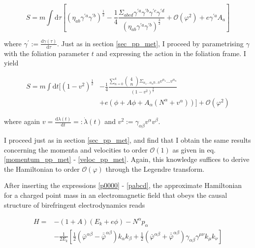 \documentclass[11pt]{article}
\begin{document}
\begin{equation}
	S = 
	m \int \mathrm{d} \tau 
	\left[
		\left( 
			\eta_{a b} \gamma^{\prime a} \gamma^{\prime b} 
		\right)^{\frac{1}{2}}
	 -
	 \frac{1}{4}
	 \frac{
	 \Sigma_{a b c d}
	 \gamma^{\prime a} \gamma^{\prime b} \gamma^{\prime c} \gamma^{\prime d}
	 }{\left( 
			\eta_{a b} \gamma^{\prime a} \gamma^{\prime b} 
		\right)^{\frac{3}{2}}}
		+
		\mathcal{O} \left( \varphi^2 \right)
		+ e \gamma^{\prime a} A_a
	\right]
\end{equation}

where $\gamma^\prime := \frac{\mathrm{d} \gamma \left( \tau \right)}{\mathrm{d} \tau}$. Just as in section \ref{sec_pp_met}, I proceed by parametrising $\gamma$ with the foliation parameter $t$ and  expressing the action in the foliation frame. I yield

\begin{equation}
\begin{split}
	S = 
	m \int \mathrm{d} t 
	[
		\left( 
			1 - v^2
		\right)^{\frac{1}{2}}
	&-
	\frac{1}{4}
	\frac{
	\sum_{n = 0}^4 
	\begin{pmatrix}
		4\\ n
	\end{pmatrix}
	 \Sigma_{\alpha_1 \dots \alpha_n 0 \dots 0}
	 v^{\alpha_1} \dots v^{\alpha_n}
	 }{\left( 
			1 - v^2
		\right)^{\frac{3}{2}}} \\
		&+ e \left(
			\phi + A \phi +  A_\alpha \left( N^\alpha + v^\alpha\right)
		\right) 
	]
	+
	\mathcal{O} \left( \varphi^2 \right)
\end{split}
\end{equation}

where again $v = \frac{\mathrm{d} \lambda (t)}{\mathrm{d} t } =: \dot{\lambda} (t) $ and $v^2 := \gamma_{\alpha \beta} v^\alpha v^\beta $. 

I proceed just as in section \ref{sec_pp_met}, and find that I obtain the same results concerning the momenta and velocities to order $\mathcal{O} \left( 1
	\right)$ as given in eq. \ref{momentum_pp_met} - \ref{veloc_pp_met}. Again, this knowledge suffices to derive the Hamiltonian to order  $\mathcal{O} \left( \varphi \right)$ through the Legendre transform.
	
	After inserting the expressions \ref{p0000} - \ref{pabcd}, the approximate Hamiltonian for a charged point mass in an electromagnetic field that obeys the causal structure of birefringent electrodynamics reads
	
\begin{equation}
	\begin{split}
		H = 
		&- \left( 1 + A \right) \left( E_k + e \phi \right) 
		- N^\alpha p_\alpha \\
		&- \frac{1}{2 E_k} \left[ 
			\frac{1}{2} 
			\left( 
				\bar{\varphi}^{\alpha \beta} 
				- \bar{\bar{\varphi}}^{\alpha \beta}
			\right) 
			k_\alpha k_\beta
			+
			\frac{1}{2} 
			\left( 
				\bar{\varphi}^{\alpha \beta} 
				+ \bar{\bar{\varphi}}^{\alpha \beta}
			\right) 
			\gamma_{\alpha \beta} \gamma^{\mu \nu}
			k_\mu k_\nu
		\right]
	\end{split}
\end{equation}
\end{document}
